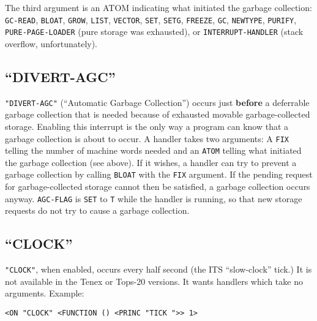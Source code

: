 \documentclass[a4paper]{scrbook}
\begin{document}
The third argument is an ATOM indicating what initiated the garbage collection: \texttt{GC-READ},
\texttt{BLOAT}, \texttt{GROW}, \texttt{LIST},
\texttt{VECTOR}, \texttt{SET}, \texttt{SETG},
\texttt{FREEZE}, \texttt{GC}, \texttt{NEWTYPE},
\texttt{PURIFY}, \texttt{PURE-PAGE-LOADER} (pure storage was
exhausted), or \texttt{INTERRUPT-HANDLER} (stack overflow, unfortunately).

\subsection{\texorpdfstring{``DIVERT-AGC''}{21.8.5. DIVERT-AGC}}\label{divert-agc}

\texttt{"DIVERT-AGC"}  (``Automatic Garbage Collection'') occurs just \textbf{before}
a deferrable garbage collection that is needed because of exhausted movable garbage-collected storage. Enabling this
interrupt is the only way a program can know that a garbage collection is about to occur. A handler takes two arguments: A
\texttt{FIX} telling the number of machine words needed and an \texttt{ATOM} telling what initiated the garbage collection
(see above). If it wishes, a handler can try to prevent a garbage collection by calling \texttt{BLOAT} with the
\texttt{FIX} argument. If the pending request for garbage-collected storage cannot then be satisfied, a garbage collection
occurs anyway. \texttt{AGC-FLAG}  is \texttt{SET} to \texttt{T} while the handler is
running, so that new storage requests do not try to cause a garbage collection.

\subsection{\texorpdfstring{``CLOCK''}{21.8.6. CLOCK}}\label{clock}

\texttt{"CLOCK"},  when enabled, occurs every half second (the ITS
``slow-clock'' tick.) It is not available in the Tenex or Tops-20 versions.
It wants handlers which take no arguments. Example:

\begin{verbatim}
<ON "CLOCK" <FUNCTION () <PRINC "TICK ">> 1>
\end{verbatim}
\end{document}

